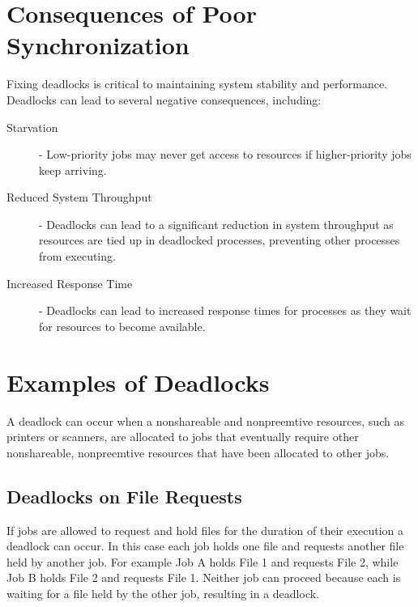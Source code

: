 \documentclass[12pt letter]{report}
\begin{document}
\section{Consequences of Poor Synchronization}


Fixing deadlocks is critical to maintaining system stability and
performance. Deadlocks can lead to several negative consequences,
including:
\begin{description}
  \item[Starvation]  - Low-priority jobs may never get access to
    resources if higher-priority jobs keep arriving.
  \item[Reduced System Throughput]  - Deadlocks can lead to a
    significant reduction in system throughput as resources are
    tied up in deadlocked processes, preventing other processes from
    executing.
  \item[Increased Response Time]  - Deadlocks can lead to increased
    response times for processes as they wait for resources to
    become available.
\end{description}

\section{Examples of Deadlocks}

A deadlock can occur when a nonshareable  and nonpreemtive resources,
such as printers or scanners, are allocated to jobs that eventually
require other nonshareable, nonpreemtive resources that have been
allocated to other jobs.

\subsection{Deadlocks on File Requests}

If jobs are allowed to request and hold files for the duration of
their execution a deadlock can occur. In this case each job holds one
file and requests another file held by another job. For example Job A
holds File 1 and requests File 2, while Job B holds File 2 and
requests File 1. Neither job can proceed because each is waiting for a
file held by the other job, resulting in a deadlock.
\end{document}
